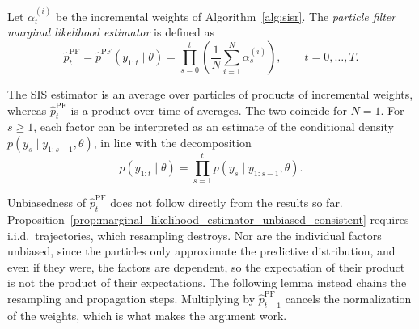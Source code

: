 \begin{definition}
    \label{def:pf_marginal_likelihood_estimator}
    Let $\alpha_t^{(i)}$ be the incremental weights of Algorithm~\ref{alg:sisr}. The \emph{particle filter marginal likelihood estimator} is defined as
    \begin{equation}
        \hat{p}^{\mathrm{PF}}_t = \hat{p}^{\mathrm{PF}}(y_{1:t}\mid\theta) = \prod_{s=0}^{t} \left(\frac{1}{N}\sum_{i=1}^{N} \alpha_s^{(i)}\right), \qquad t=0,\ldots,T.
        \label{eq:pf_marginal_likelihood_estimator}
    \end{equation}
\end{definition}
The SIS estimator is an average over particles of products of incremental weights, whereas $\hat{p}^{\mathrm{PF}}_t$ is a product over time of averages. The two coincide for $N=1$. For $s\ge 1$, each factor can be interpreted as an estimate of the conditional density $p(y_s\mid y_{1:s-1},\theta)$, in line with the decomposition
\begin{equation}
    p(y_{1:t}\mid\theta) = \prod_{s=1}^{t} p(y_s\mid y_{1:s-1},\theta).
\end{equation}

Unbiasedness of $\hat{p}^{\mathrm{PF}}_t$ does not follow directly from the results so far. Proposition~\ref{prop:marginal_likelihood_estimator_unbiased_consistent} requires i.i.d.\ trajectories, which resampling destroys. Nor are the individual factors unbiased, since the particles only approximate the predictive distribution, and even if they were, the factors are dependent, so the expectation of their product is not the product of their expectations. The following lemma instead chains the resampling and propagation steps. Multiplying by $\hat{p}^{\mathrm{PF}}_{t-1}$ cancels the normalization of the weights, which is what makes the argument work.

